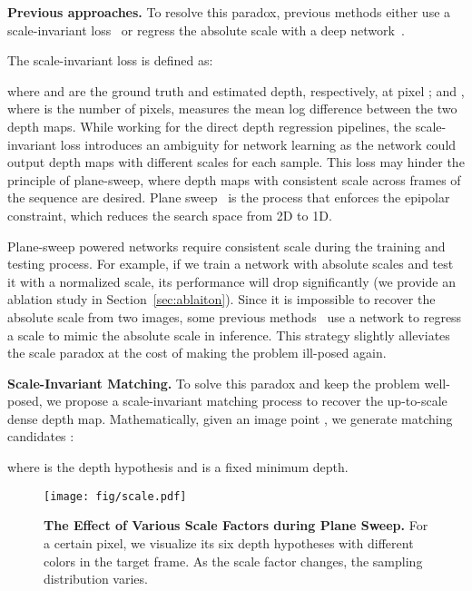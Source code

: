 \documentclass[final]{cvpr}
\begin{document}
\textbf{Previous approaches.}  To resolve this paradox, previous methods either use a scale-invariant loss~\cite{eigen2014depth} or regress the absolute scale with a deep network~\cite{ummenhofer2017demon,teed2018deepv2d,wei2019deepsfm}. 

The scale-invariant loss  is defined as:

where  and  are the ground truth and estimated depth, respectively, at pixel ; and \scalebox{0.9}{}, where  is the number of pixels, measures the mean log difference between the two depth maps. While working for the direct depth regression pipelines, the scale-invariant loss introduces an ambiguity for network learning as the network could output depth maps with different scales for each sample. This loss may hinder the principle of plane-sweep, where depth maps with consistent scale across frames of the sequence are desired.
Plane sweep~\cite{im2019dpsnet} is the process that enforces the epipolar constraint, which reduces the search space from 2D to 1D. 

Plane-sweep powered networks require consistent scale during the training and testing process. For example, if we train a network with absolute scales and test it with a normalized scale, its performance will drop significantly (we provide an ablation study in Section~\ref{sec:ablaiton}). Since it is impossible to recover the absolute scale from two images, some previous methods~\cite{ummenhofer2017demon,teed2018deepv2d,wei2019deepsfm} use a network to regress a scale to mimic the absolute scale in inference. This strategy slightly alleviates the scale paradox at the cost of making the problem ill-posed again.

\textbf{Scale-Invariant Matching.}  To solve this paradox and keep the problem well-posed, we propose a scale-invariant matching process to recover the up-to-scale dense depth map.
Mathematically, given an image point , we generate  matching candidates :

where  is the depth hypothesis and  is a fixed minimum depth. 
\begin{figure}[t]
\begin{center}
  \texttt{[image: fig/scale.pdf]}
\end{center}
\vspace{-4mm}
  \caption{\small \textbf{The Effect of Various Scale Factors during Plane Sweep.} For a certain pixel, we visualize its six depth hypotheses with different colors in the target frame. As the scale factor  changes, the sampling distribution varies.}
\label{fig:scale_plane_sweep}
\vspace{-4mm}
\end{figure}
\end{document}

